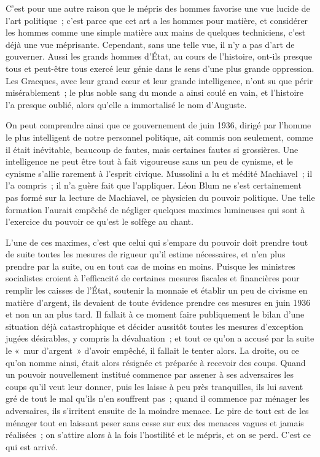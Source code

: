 \documentclass[french,twoside]{book} %
\begin{document}
C'est pour une autre raison que le mépris des hommes favorise une vue lucide de l'art politique ; c'est parce que cet art a les hommes pour matière, et considérer les hommes comme une simple matière aux mains de quelques techniciens, c'est déjà une vue méprisante. Cependant, sans une telle vue, il n'y a pas d'art de gouverner. Aussi les grands hommes d'État, au cours de l'histoire, ont-ils presque tous et peut-être tous exercé leur génie dans le sens d'une plus grande oppression. Les Gracques, avec leur grand cœur et leur grande intelligence, n'ont su que périr misérablement ; le plus noble sang du monde a ainsi coulé en vain, et l'histoire l'a presque oublié, alors qu'elle a immortalisé le nom d'Auguste.\par
On peut comprendre ainsi que ce gouvernement de juin 1936, dirigé par l'homme le plus intelligent de notre personnel politique, ait commis non seulement, comme il était inévitable, beaucoup de fautes, mais certaines fautes si grossières. Une intelligence ne peut être tout à fait vigoureuse sans un peu de cynisme, et le cynisme s'allie rarement à l'esprit civique. Mussolini a lu et médité Machiavel ; il l'a compris ; il n'a guère fait que l'appliquer. Léon Blum ne s'est certainement pas formé sur la lecture de Machiavel, ce physicien du pouvoir politique. Une telle formation l'aurait empêché de négliger quelques maximes lumineuses qui sont à l'exercice du pouvoir ce qu'est le solfège au chant.\par
L'une de ces maximes, c'est que celui qui s'empare du pouvoir doit prendre tout de suite toutes les mesures de rigueur qu'il estime nécessaires, et n'en plus prendre par la suite, ou en tout cas de moins en moins. Puisque les ministres socialistes croient à l'efficacité de certaines mesures fiscales et financières pour remplir les caisses de l'État, soutenir la monnaie et établir un peu de civisme en matière d'argent, ils devaient de toute évidence prendre ces mesures en juin 1936 et non un an plus tard. Il fallait à ce moment faire publiquement le bilan d'une situation déjà catastrophique et décider aussitôt toutes les mesures d'exception jugées désirables, y compris la dévaluation ; et tout ce qu'on a accusé par la suite le « mur d'argent » d'avoir empêché, il fallait le tenter alors. La droite, ou ce qu'on nomme ainsi, était alors résignée et préparée à recevoir des coups. Quand un pouvoir nouvellement institué commence par assener à ses adversaires les coups qu'il veut leur donner, puis les laisse à peu près tranquilles, ils lui savent gré de tout le mal qu'ils n'en souffrent pas ; quand il commence par ménager les adversaires, ils s'irritent ensuite de la moindre menace. Le pire de tout est de les ménager tout en laissant peser sans cesse sur eux des menaces vagues et jamais réalisées ; on s'attire alors à la fois l'hostilité et le mépris, et on se perd. C'est ce qui est arrivé.\par
\end{document}
